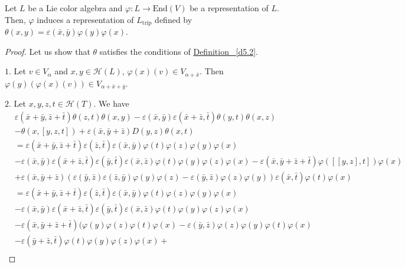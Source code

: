 \documentclass[11pt, twoside]{article}
\begin{document}
\begin{prop}
    Let $L$ be a Lie color algebra and $\varphi: L\to \mathrm{End}(V)$ be a representation of $L$. Then, $\varphi$ induces a representation of $L_{\mathrm{trip}} $ defined by $\theta(x,y)=\varepsilon(\bar{x},\bar{y})\varphi(y)\varphi(x) $.
\end{prop}

\begin{proof}
    Let us show that $\theta$ satisfies the conditions of  \hyperref[d5.2]{Definition ~\ref*{d5.2}}.

    $1$. Let $v\in V_{\alpha} $ and $x,y\in \mathcal{H}(L)$, $\varphi(x)(v)\in V_{\alpha+\bar{x}} $.  Then $\varphi(y)(\varphi(x)(v))\in V_{\alpha+\bar{x}+\bar{y}} $. 

    $2.$ Let $x,y,z,t\in \mathcal{H}(T) $. We have \begin{align*}   
    &\varepsilon(\bar{x}+\bar{y},\bar{z}+\bar{t})\theta(z,t)\theta(x,y)-\varepsilon(\bar{x},\bar{y})\varepsilon(\bar{x}+\bar{z},\bar{t})\theta(y,t)\theta(x,z) \\ &-\theta(x,[y,z,t])+ \varepsilon(\bar{x},\bar{y}+\bar{z})D(y,z)\theta(x,t) \\ 
&=\varepsilon(\bar{x}+\bar{y},\bar{z}+\bar{t})\varepsilon(\bar{z},\bar{t})\varepsilon(\bar{x},\bar{y})\varphi(t)\varphi(z)\varphi(y)\varphi(x)\\
&-\varepsilon(\bar{x},\bar{y})\varepsilon(\bar{x}+\bar{z},\bar{t})\varepsilon(\bar{y},\bar{t})\varepsilon(\bar{x},\bar{z})\varphi(t)\varphi(y)\varphi(z)\varphi(x) - \varepsilon(\bar{x},\bar{y}+\bar{z}+\bar{t})\varphi([[y,z],t])\varphi(x) \\ &+ \varepsilon(\bar{x},\bar{y}+\bar{z})(\varepsilon(\bar{y},\bar{z})\varepsilon(\bar{z},\bar{y})\varphi(y)\varphi(z)- \varepsilon(\bar{y},\bar{z})\varphi(z)\varphi(y))\varepsilon(\bar{x},\bar{t})\varphi(t)\varphi(x)\\ &=\varepsilon(\bar{x}+\bar{y},\bar{z}+\bar{t})\varepsilon(\bar{z},\bar{t})\varepsilon(\bar{x},\bar{y})\varphi(t)\varphi(z)\varphi(y)\varphi(x) \\ &- \varepsilon(\bar{x},\bar{y})\varepsilon(\bar{x}+\bar{z},\bar{t})\varepsilon(\bar{y},\bar{t})\varepsilon(\bar{x},\bar{z})\varphi(t)\varphi(y)\varphi(z)\varphi(x) \\ &- \varepsilon(\bar{x},\bar{y}+\bar{z}+\bar{t})(\varphi(y)\varphi(z)\varphi(t)\varphi(x)- \varepsilon(\bar{y},\bar{z})\varphi(z)\varphi(y)\varphi(t)\varphi(x)\\ &- \varepsilon(\bar{y}+\bar{z},\bar{t})\varphi(t)\varphi(y)\varphi(z)\varphi(x)+ \\  

\end{align*}
\end{proof}
\end{document}
